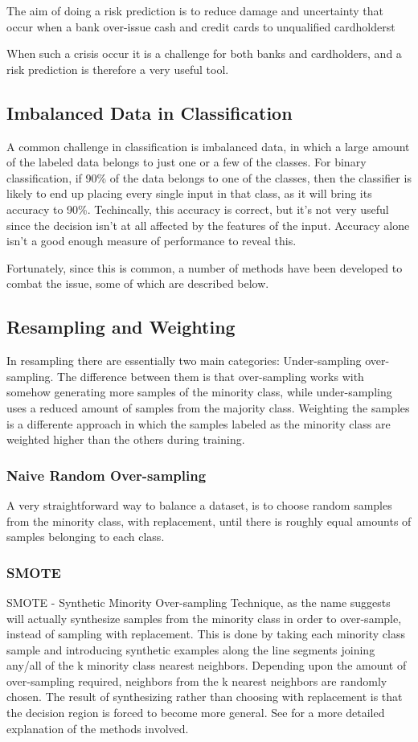 The aim of doing a risk prediction is to reduce damage and 
uncertainty that occur when a bank over-issue cash and credit 
cards to unqualified cardholderst ~\cite{ComparisonData}

When such a crisis occur it is a challenge for both banks and 
cardholders, and a risk prediction is therefore a very useful tool. 


\subsection{Imbalanced Data in Classification}
A common challenge in classification is imbalanced data, in which a large
amount of the labeled data belongs to just one or a few of the classes.
For binary classification, if 90\% of the data belongs to one of the classes,
then the classifier is likely to end up placing every single
input in that class, as it will bring its accuracy to 90\%. Techincally, this
accuracy is correct, but it's not very useful since the decision isn't at all
affected by the features of the input. Accuracy alone isn't a good enough
measure of performance to reveal this.

Fortunately, since this is common, a number of methods have been developed
to combat the issue, some of which are described below.

\subsection{Resampling and Weighting}
In resampling there are essentially two main categories: Under-sampling
over-sampling. The difference between them is that over-sampling works with
somehow generating more samples of the minority class, while under-sampling
uses a reduced amount of samples from the majority class.
Weighting the samples is a differente approach in which the samples labeled
as the minority class are weighted higher than the others during training.

\subsubsection{Naive Random Over-sampling}
A very straightforward way to balance a dataset, is to choose random samples 
from the minority class, with replacement, until there is roughly equal
amounts of samples belonging to each class.

\subsubsection{SMOTE}
SMOTE - Synthetic Minority Over-sampling Technique, as the name suggests will
actually synthesize samples from the minority class in order to over-sample,
instead of sampling with replacement. This is done by taking each minority 
class sample and introducing synthetic examples along the line segments joining 
any/all of the k minority class nearest neighbors. Depending upon the amount of 
over-sampling required, neighbors from the k nearest neighbors are randomly
chosen. The result of synthesizing rather than choosing with replacement is
that the decision region is forced to become more general.
See \cite{smote-article} for a more detailed explanation of the methods
involved.

